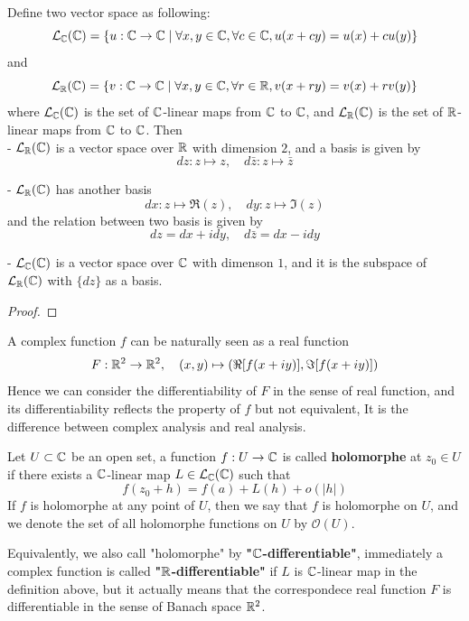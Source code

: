 \begin{lemma}
    Define two vector space as following:
    \[\mathcal{L}_{\mathbb{C}}(\mathbb{C}) = \{u: \mathbb{C} \to \mathbb{C} \mid \forall x,y \in \mathbb{C}, \forall c \in \mathbb{C}, u(x+cy) = u(x) + cu(y)\}\]
    and
    \[\mathcal{L}_{\mathbb{R}}(\mathbb{C}) = \{v: \mathbb{C} \to \mathbb{C} \mid \forall x,y \in \mathbb{C}, \forall r \in \mathbb{R}, v(x+ry) = v(x) + rv(y)\}\]
    where \(\mathcal{L}_{\mathbb{C}}(\mathbb{C})\) is the set of \(\mathbb{C}\)-linear maps from \(\mathbb{C}\) to \(\mathbb{C}\), and \(\mathcal{L}_{\mathbb{R}}(\mathbb{C})\) is the set of \(\mathbb{R}\)-linear maps from \(\mathbb{C}\) to \(\mathbb{C}\). Then\\

    - \(\mathcal{L}_{\mathbb{R}}(\mathbb{C})\) is a vector space over \(\mathbb{R}\) with dimension \(2\), and a basis is given by
    \[dz: z \mapsto z , \quad d\bar{z}: z \mapsto \bar{z}\]

    - \(\mathcal{L}_{\mathbb{R}}(\mathbb{C})\) has another basis
    \[dx:z \mapsto \Re(z), \quad dy: z \mapsto \Im(z)\]
    and the relation between two basis is given by
    \[dz = dx + i dy, \quad d\bar{z} = dx - i dy\]

    - \(\mathcal{L}_{\mathbb{C}}(\mathbb{C})\) is a vector space over \(\mathbb{C}\) with dimenson \(1\), and it is the subspace of \(\mathcal{L}_{\mathbb{R}}(\mathbb{C})\) with \(\{dz\}\) as a basis.\\
\end{lemma}
\begin{proof}
    
\end{proof}

A complex function \(f\) can be naturally seen as a real function
\[F: \mathbb{R}^2 \to \mathbb{R}^2, \quad (x,y) \mapsto (\Re[f(x+iy)], \Im[ f(x+iy)])\]
Hence we can consider the differentiability of \(F\) in the sense of real function, and its differentiability reflects the property of \(f\) but not equivalent, It is the difference between complex analysis and real analysis.

\begin{definition}
    Let \(U \subset \mathbb{C}\) be an open set, a function \(f: U \to \mathbb{C}\) is called \textbf{holomorphe} at \(z_0 \in U\) if there exists a \(\mathbb{C}\)-linear map \(L \in \mathcal{L}_{\mathbb{C}}(\mathbb{C})\) such that 
    \[f(z_0+h) = f(a) + L(h) + o(|h|)\]
    If \(f\) is holomorphe at any point of \(U\), then we say that \(f\) is holomorphe on \(U\), and we denote the set of all holomorphe functions on \(U\) by \(\mathcal{O}(U)\).
\end{definition}

Equivalently, we also call "holomorphe" by \textbf{"\(\mathbb{C}\)-differentiable"}, immediately a complex function is called \textbf{"\(\mathbb{R}\)-differentiable"} if \(L\) is \(\mathbb{C}\)-linear map in the definition above, but it actually means that the correspondece real function \(F\) is differentiable in the sense of Banach space \(\mathbb{R}^2\). 

